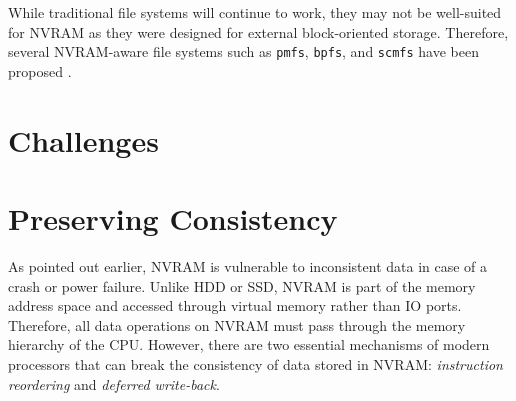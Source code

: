 While traditional file systems will continue to work, they may not be
well-suited for NVRAM as they were designed for external block-oriented
storage. Therefore, several NVRAM-aware file systems such as \texttt{pmfs},
\texttt{bpfs}, and \texttt{scmfs} have been proposed \cite{condit2009better,
wu2011scmfs, dulloor2014system}.




\section{Challenges}


\section{Preserving Consistency}

As pointed out earlier, NVRAM is vulnerable to inconsistent data in case of
a crash or power failure. Unlike HDD or SSD, NVRAM is part of
the memory address space and accessed through virtual memory rather than IO
ports. Therefore, all data operations on NVRAM must pass through the memory
hierarchy of the CPU. However, there are two essential mechanisms of modern
processors that can break the consistency of data stored in NVRAM:
\emph{instruction reordering} and \emph{deferred write-back}.



